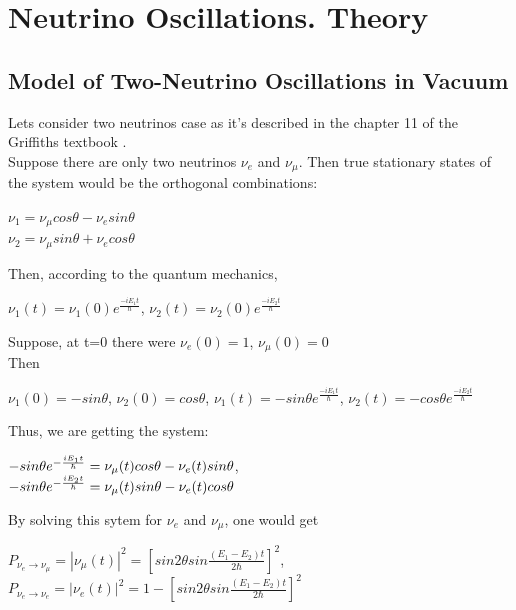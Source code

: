 \section{Neutrino Oscillations. Theory}

\subsection{Model of Two-Neutrino Oscillations in Vacuum}
Lets consider two neutrinos case as it's described in the chapter 11 of the Griffiths textbook \cite{ref_Griffiths}.\\
Suppose there are only two neutrinos $\nu_e$ and $\nu_{\mu}$. Then true stationary states of the system would be the orthogonal combinations:\\

\begin{center}
$\nu_1=\nu_{\mu}cos\theta-\nu_esin\theta$\\
$\nu_2=\nu_{\mu}sin\theta+\nu_ecos\theta$\\
\end{center}

Then, according to the quantum mechanics,\\
\begin{center}
$\nu_1(t)=\nu_1(0)e^{\frac{-iE_1t}{\hbar}}$, $\nu_2(t)=\nu_2(0)e^{\frac{-iE_2t}{\hbar}}$\\
\end{center}

Suppose, at t=0 there were $\nu_e(0)=1$, $\nu_\mu(0)=0$\\
Then 
\begin{center}
$\nu_1(0)=-sin\theta$, $\nu_2(0)=cos\theta$, $\nu_1(t)=-{sin\theta}e^{\frac{-iE_1t}{\hbar}}$, $\nu_2(t)=-{cos\theta}e^{\frac{-iE_2t}{\hbar}}$\\
\end{center}

Thus, we are getting the system:\\
\begin{center}
$-{sin\theta}e^{-{{iE_1t} \over \hbar}}=\nu_\mu(t)cos\theta-\nu_e(t)sin\theta$,\\
$-{sin\theta}e^{-{{iE_2t} \over \hbar}}=\nu_\mu(t)sin\theta-\nu_e(t)cos\theta$\\
\end{center}

By solving this sytem for $\nu_e$ and $\nu_\mu$, one would get\\
\begin{center}
$P_{\nu_e \rightarrow \nu_\mu}=|\nu_\mu(t)|^2=[{sin2\theta}sin{\frac{(E_1-E_2)t}{2\hbar}}]^2$,\\
$P_{\nu_e \rightarrow \nu_e}=|\nu_e(t)|^2=1-[{sin2\theta}sin{\frac{(E_1-E_2)t}{2\hbar}}]^2$\\
\end{center}

